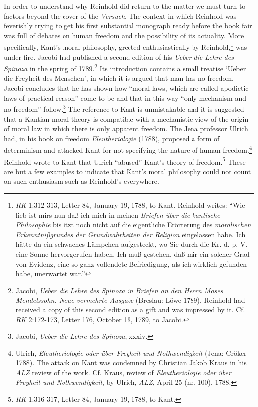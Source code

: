  In order to understand why Reinhold did return to the matter we must turn to factors beyond the cover of the \textit{Versuch}. The context in which Reinhold was feverishly trying to get his first substantial monograph ready before the book fair was full of debates on human freedom and the possibility of its actuality. More specifically, Kant's moral philosophy, greeted enthusiastically by Reinhold,\footnote{ \textit{RK} 1:312{-}313, Letter 84, January 19, 1788, to Kant. Reinhold writes: ``Wie lieb ist mirs nun da\ss{} ich mich in meinen \textit{Briefen \"{u}ber die kantische Philosophie} bis itzt noch nicht auf die eigentliche Er\"{o}rterung des \textit{moralischen Erkenntni\ss{}grundes der Grundwahrheiten der Religion} eingelassen habe. Ich h\"{a}tte da ein schwaches L\"{a}mpchen aufgesteckt, wo Sie durch die Kr. d. p. V. eine Sonne hervorgerufen haben. Ich mu\ss{} gestehen, da\ss{} mir ein solcher Grad von Evidenz, eine so ganz vollendete Befriedigung, als ich wirklich gefunden habe, unerwartet war.'' } was under fire. Jacobi had published a second edition of his \textit{Ueber die Lehre des Spinoza} in the spring of 1789.\footnote{ Jacobi, \textit{Ueber die Lehre des Spinoza in Briefen an den Herrn Moses Mendelssohn. Neue vermehrte Ausgabe} (Breslau: L\"{o}we 1789). Reinhold had received a copy of this second edition as a gift and was impressed by it. Cf. \textit{RK} 2:172{-}173, Letter 176, October 18, 1789, to Jacobi. } Its introduction contains a small treatise `Ueber die Freyheit des Menschen', in which it is argued that man has no freedom. Jacobi concludes that he has shown how ``moral laws, which are called apodictic laws of practical reason'' come to be and that in this way ``only mechanism and no freedom'' follow.\footnote{ Jacobi, \textit{Ueber die Lehre des Spinoza}, xxxiv. } The reference to Kant is unmistakable and it is suggested that a Kantian moral theory is compatible with a mechanistic view of the origin of moral law in which there is only apparent freedom. The Jena professor Ulrich had, in his book on freedom \textit{Eleutheriologie} (1788), proposed a form of determinism and attacked Kant for not specifying the nature of human freedom.\footnote{ Ulrich, \textit{Eleutheriologie oder \"{u}ber Freyheit und Nothwendigkeit} (Jena: Cr\"{o}ker 1788). The attack on Kant was condemned by Christian Jakob Kraus in his \textit{ALZ} review of the work. Cf. Kraus, review of \textit{Eleutheriologie oder \"{u}ber Freyheit und Nothwendigkeit}, by Ulrich, \textit{ALZ}, April 25 (nr. 100), 1788. } Reinhold wrote to Kant that Ulrich ``abused'' Kant's theory of freedom.\footnote{ \textit{RK} 1:316{-}317, Letter 84, January 19, 1788, to Kant. } These are but a few examples to indicate that Kant's moral philosophy could not count on such enthusiasm such as Reinhold's everywhere. 

